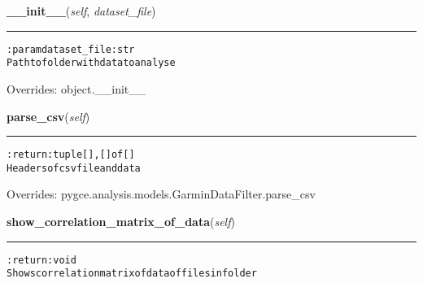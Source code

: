     \vspace{0.5ex}

\hspace{.8\funcindent}\begin{boxedminipage}{\funcwidth}

    \raggedright \textbf{\_\_init\_\_}(\textit{self}, \textit{dataset\_file})

    \vspace{-1.5ex}

    \rule{\textwidth}{0.5\fboxrule}
\setlength{\parskip}{2ex}
\begin{alltt}

:param dataset\_file: str
    Path to folder with data to analyse
\end{alltt}

\setlength{\parskip}{1ex}
      Overrides: object.\_\_init\_\_

    \end{boxedminipage}

    \vspace{0.5ex}

\hspace{.8\funcindent}\begin{boxedminipage}{\funcwidth}

    \raggedright \textbf{parse\_csv}(\textit{self})

    \vspace{-1.5ex}

    \rule{\textwidth}{0.5\fboxrule}
\setlength{\parskip}{2ex}
\begin{alltt}

:return: tuple [], [] of []
    Headers of csv file and data
\end{alltt}

\setlength{\parskip}{1ex}
      Overrides: pygce.analysis.models.GarminDataFilter.parse\_csv

    \end{boxedminipage}

    \label{pygce:analysis:models:TimelineDataAnalysis:show_correlation_matrix_of_data}

    \vspace{0.5ex}

\hspace{.8\funcindent}\begin{boxedminipage}{\funcwidth}

    \raggedright \textbf{show\_correlation\_matrix\_of\_data}(\textit{self})

    \vspace{-1.5ex}

    \rule{\textwidth}{0.5\fboxrule}
\setlength{\parskip}{2ex}
\begin{alltt}

:return: void
    Shows correlation matrix of data of files in folder
\end{alltt}

\setlength{\parskip}{1ex}
    \end{boxedminipage}

